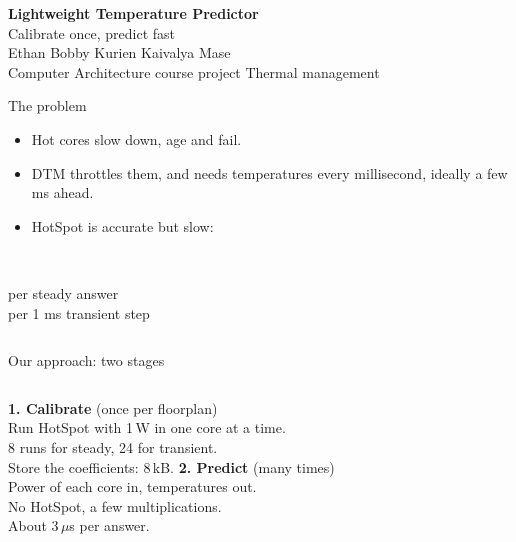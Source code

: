 \documentclass[aspectratio=169,14pt]{beamer}
\newcommand{\bignum}[2]{{\color{accent}\bfseries\huge #1}\\[-0.1em]{\color{muted}\small #2}}
\newcommand{\sub}[1]{{\color{muted}\small #1}}
\begin{document}
\begin{frame}[plain]
  \vspace{1.5em}
  {\bfseries\LARGE Lightweight Temperature Predictor}\\[0.3em]
  {\Large\color{accent} Calibrate once, predict fast}\\[1.6em]
  Ethan Bobby Kurien \quad Kaivalya Mase\\[0.2em]
  \sub{Computer Architecture course project \textperiodcentered{} Thermal management}
\end{frame}

\begin{frame}{The problem}
  \begin{itemize}
    \item Hot cores slow down, age and fail.
    \item DTM throttles them, and needs temperatures \alert{every millisecond}, ideally a few ms
          ahead.
    \item HotSpot is accurate but slow:
  \end{itemize}
  \vspace{0.6em}
  \begin{columns}[T]
    \centering \bignum{0.24 s}{per steady answer}
    \centering \bignum{5.5 ms}{per 1 ms transient step}
  \end{columns}
\end{frame}

\begin{frame}{Our approach: two stages}
  \begin{columns}[T]
      {\bfseries\color{accent} 1. Calibrate} \sub{(once per floorplan)}\\[0.4em]
      Run HotSpot with 1\,W in one core at a time.\\[0.3em]
      8 runs for steady, 24 for transient.\\[0.3em]
      Store the coefficients: \alert{8\,kB}.
      {\bfseries\color{accent} 2. Predict} \sub{(many times)}\\[0.4em]
      Power of each core in, temperatures out.\\[0.3em]
      No HotSpot, a few multiplications.\\[0.3em]
      \alert{About 3\,$\mu$s} per answer.
  \end{columns}
\end{frame}
\end{document}
